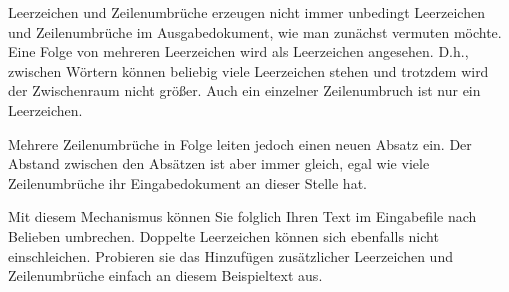 \documentclass[a4paper,twoside,10pt]{article}
\begin{document}
Leerzeichen und Zeilenumbrüche erzeugen nicht immer unbedingt Leerzeichen und Zeilenumbrüche im Ausgabedokument, wie man zunächst vermuten möchte. Eine Folge von mehreren Leerzeichen wird als Leerzeichen angesehen. D.h., zwischen Wörtern können beliebig viele Leerzeichen stehen und trotzdem wird der Zwischenraum nicht größer. Auch ein einzelner Zeilenumbruch ist nur ein Leerzeichen.

Mehrere Zeilenumbrüche in Folge leiten jedoch einen neuen Absatz ein. Der Abstand zwischen den Absätzen ist aber immer gleich, egal wie viele Zeilenumbrüche ihr Eingabedokument an dieser Stelle hat.

Mit diesem Mechanismus können Sie folglich Ihren Text im Eingabefile nach Belieben umbrechen. Doppelte Leerzeichen können sich ebenfalls nicht einschleichen. Probieren sie das Hinzufügen zusätzlicher Leerzeichen und Zeilenumbrüche einfach an diesem Beispieltext aus.
\end{document}
